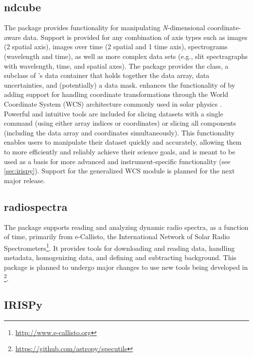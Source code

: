 \subsection{ndcube}
\label{sec:ndcube}

The  package provides functionality for manipulating \textit{N}-dimensional coordinate-aware data.
Support is provided for any combination of axis types such as images (2 spatial axis), images over time (2 spatial and 1 time axis), spectrograms (wavelength and time), as well as more complex data sets (e.g., slit spectragraphs with wavelength, time, and spatial axes).
The package provides the  class, a subclass of \astropy's  data container that holds together the data array, data uncertainties, and (potentially) a data mask.
 enhances the functionality of  by adding support for handling coordinate transformations through the World Coordinate System (WCS) architecture commonly used in solar physics \citep{2002A&A...395.1061G, 2006A&A...449..791T}.
Powerful and intuitive tools are included for slicing datasets with a single command (using either array indices or coordinates) or slicing all components (including the data array and coordinates simultaneously).
This functionality enables users to manipulate their dataset quickly and accurately, allowing them to more efficiently and reliably achieve their science goals, and is meant to be used as a basis for more advanced and instrument-specific functionality (see \autoref{sec:irispy}).
Support for the generalized WCS module \citep{gwcs2018} is planned for the next major release.

\subsection{radiospectra}

The  package supports reading and analyzing dynamic radio spectra, as a function of time, primarily from e-Callisto, the International Network of Solar Radio Spectrometers\footnote{\url{http://www.e-callisto.org}}.
It provides tools for downloading and reading data, handling metadata, homogenizing data, and defining and subtracting background.
This package is planned to undergo major changes to use new tools being developed in \footnote{\url{https://github.com/astropy/specutils}}.

\subsection{IRISPy}
\label{sec:irispy}

